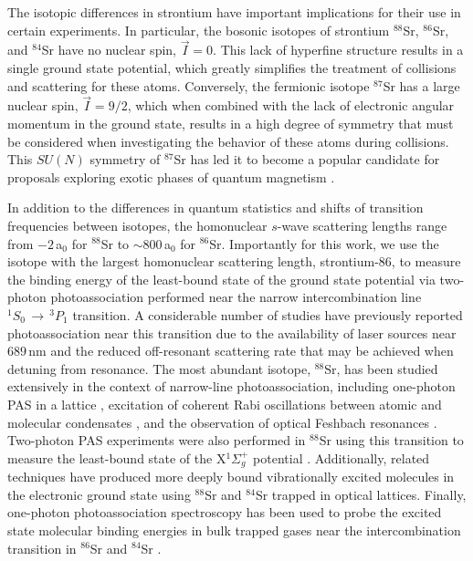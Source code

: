 The isotopic differences in strontium have important implications for their use in certain experiments.
In particular, the bosonic isotopes of strontium $^{88}$Sr, $^{86}$Sr, and $^{84}$Sr have no nuclear spin, $\vec{I}=0$.
This lack of hyperfine structure results in a single ground state potential, which greatly simplifies the treatment of collisions and scattering for these atoms.
Conversely, the fermionic isotope $^{87}$Sr has a large nuclear spin, $\vec{I}=9/2$, which when combined with the lack of electronic angular momentum in the ground state, results in a high degree of symmetry that must be considered when investigating the behavior of these atoms during collisions.
This $SU(N)$ symmetry of $^{87}$Sr has led it to become a popular candidate for proposals exploring exotic phases of quantum magnetism \cite{Beverland2016,cre14,Chen2015}.

In addition to the differences in quantum statistics and shifts of transition frequencies between isotopes, the homonuclear $s$-wave scattering lengths range from $-2\,$a$_0$ for $^{88}$Sr to $\sim\!800\,$a$_0$ for $^{86}$Sr.
Importantly for this work, we use the isotope with the largest homonuclear scattering length, strontium-86, to measure the binding energy of the least-bound state of the ground state potential via two-photon photoassociation performed near the narrow intercombination line $^1S_0\,\rightarrow\,^3P_1$ transition.
A considerable number of studies have previously reported photoassociation near this transition due to the availability of laser sources near $689\,$nm and the reduced off-resonant scattering rate that may be achieved when detuning from resonance.
The most abundant isotope, $^{88}$Sr, has been studied extensively in the context of narrow-line photoassociation, including one-photon PAS in a lattice \cite{Zelevinsky2006,McGuyer2013}, excitation of coherent Rabi oscillations between atomic and molecular condensates \cite{Yan2013b}, and the observation of optical Feshbach resonances \cite{Yan2013c, Blatt}.
Two-photon PAS experiments were also performed in $^{88}$Sr using this transition to measure the least-bound state of the X$^1\Sigma_g^+$ potential \cite{MartinezDeEscobar2008}.
Additionally, related techniques have produced more deeply bound vibrationally excited molecules in the electronic ground state using $^{88}$Sr \cite{Reinaudi2012, McGuyer2014, McGuyer2015a, rom12} and $^{84}$Sr \cite{Stellmer2012} trapped in optical lattices.
Finally, one-photon photoassociation spectroscopy has been used to probe the excited state molecular binding energies in bulk trapped gases near the intercombination transition in $^{86}$Sr \cite{Borkowski2014a, Reschovsky} and $^{84}$Sr \cite{Stellmer2012, Reschovsky}.

